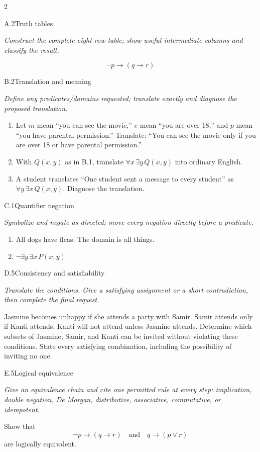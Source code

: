 \documentclass[9pt]{extarticle}
\begin{document}
\CoreWorkArea
\FormBreak
{}
\begin{multicols}{2}
\begin{CoreProblem}{A.2}{Truth tables}
{\scriptsize\textit{Construct the complete eight-row table; show useful intermediate columns and classify the result.}\par}
\[
  \neg p\to(q\to r)
\]
\end{CoreProblem}
\begin{CoreProblem}{B.2}{Translation and meaning}
{\scriptsize\textit{Define any predicates/domains requested; translate exactly and diagnose the proposed translation.}\par}
\begin{enumerate}[label=(\alph*)]
  \item Let $m$ mean ``you can see the movie,'' $e$ mean ``you are over 18,''
        and $p$ mean ``you have parental permission.'' Translate: ``You can
        see the movie only if you are over 18 or have parental permission.''
  \item With $Q(x,y)$ as in B.1, translate $\forall x\,\exists y\,Q(x,y)$
        into ordinary English.
  \item A student translates ``One student sent a message to every student''
        as $\forall y\,\exists x\,Q(x,y)$. Diagnose the translation.
\end{enumerate}
\end{CoreProblem}
\begin{CoreProblem}{C.1}{Quantifier negation}
{\scriptsize\textit{Symbolize and negate as directed; move every negation directly before a predicate.}\par}
\begin{enumerate}[label=(\alph*)]
  \item All dogs have fleas. The domain is all things.
  \item $\neg\exists y\,\exists x\,P(x,y)$
\end{enumerate}
\end{CoreProblem}
\columnbreak
\begin{CoreProblem}{D.5}{Consistency and satisfiability}
{\scriptsize\textit{Translate the conditions. Give a satisfying assignment or a short contradiction, then complete the final request.}\par}
Jasmine becomes unhappy if she attends a party with Samir. Samir attends only
if Kanti attends. Kanti will not attend unless Jasmine attends. Determine which
subsets of Jasmine, Samir, and Kanti can be invited without violating these
conditions. State every satisfying combination, including the possibility of
inviting no one.
\end{CoreProblem}
\begin{CoreProblem}{E.5}{Logical equivalence}
{\scriptsize\textit{Give an equivalence chain and cite one permitted rule at every step: implication, double negation, De Morgan, distributive, associative, commutative, or idempotent.}\par}
Show that
\[
  \neg p\to(q\to r)
  \quad\text{and}\quad
  q\to(p\lor r)
\]
are logically equivalent.
\end{CoreProblem}
\end{multicols}
\end{document}
